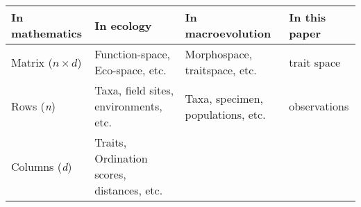 \documentclass[]{article}
\begin{document}
\begin{longtable}[]{@{}llll@{}}
\toprule
\begin{minipage}[b]{0.20\columnwidth}\raggedright\strut
In mathematics\strut
\end{minipage} & \begin{minipage}[b]{0.16\columnwidth}\raggedright\strut
In ecology\strut
\end{minipage} & \begin{minipage}[b]{0.25\columnwidth}\raggedright\strut
In macroevolution\strut
\end{minipage} & \begin{minipage}[b]{0.20\columnwidth}\raggedright\strut
In this paper\strut
\end{minipage}\tabularnewline
\midrule
\endhead
\begin{minipage}[t]{0.20\columnwidth}\raggedright\strut
Matrix (\(n \times d\))\strut
\end{minipage} & \begin{minipage}[t]{0.16\columnwidth}\raggedright\strut
Function-space, Eco-space, etc.\strut
\end{minipage} & \begin{minipage}[t]{0.25\columnwidth}\raggedright\strut
Morphospace, traitspace, etc.\strut
\end{minipage} & \begin{minipage}[t]{0.20\columnwidth}\raggedright\strut
trait space\strut
\end{minipage}\tabularnewline
\begin{minipage}[t]{0.20\columnwidth}\raggedright\strut
Rows (\emph{n})\strut
\end{minipage} & \begin{minipage}[t]{0.16\columnwidth}\raggedright\strut
Taxa, field sites, environments, etc.\strut
\end{minipage} & \begin{minipage}[t]{0.25\columnwidth}\raggedright\strut
Taxa, specimen, populations, etc.\strut
\end{minipage} & \begin{minipage}[t]{0.20\columnwidth}\raggedright\strut
observations\strut
\end{minipage}\tabularnewline
\begin{minipage}[t]{0.20\columnwidth}\raggedright\strut
Columns (\emph{d})\strut
\end{minipage} & \begin{minipage}[t]{0.16\columnwidth}\raggedright\strut
Traits, Ordination scores, distances, etc.\strut

\end{minipage}
\end{longtable}
\end{document}
